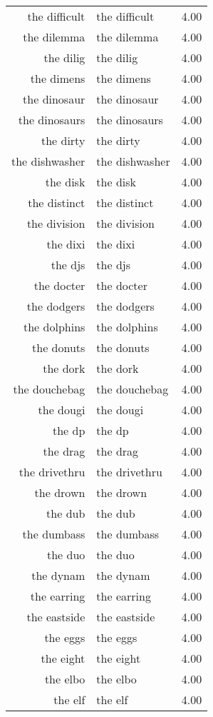 \begin{table}[ht]
\begin{tabular}{rlr}
  the difficult & the difficult & 4.00 \\ 
  the dilemma & the dilemma & 4.00 \\ 
  the dilig & the dilig & 4.00 \\ 
  the dimens & the dimens & 4.00 \\ 
  the dinosaur & the dinosaur & 4.00 \\ 
  the dinosaurs & the dinosaurs & 4.00 \\ 
  the dirty & the dirty & 4.00 \\ 
  the dishwasher & the dishwasher & 4.00 \\ 
  the disk & the disk & 4.00 \\ 
  the distinct & the distinct & 4.00 \\ 
  the division & the division & 4.00 \\ 
  the dixi & the dixi & 4.00 \\ 
  the djs & the djs & 4.00 \\ 
  the docter & the docter & 4.00 \\ 
  the dodgers & the dodgers & 4.00 \\ 
  the dolphins & the dolphins & 4.00 \\ 
  the donuts & the donuts & 4.00 \\ 
  the dork & the dork & 4.00 \\ 
  the douchebag & the douchebag & 4.00 \\ 
  the dougi & the dougi & 4.00 \\ 
  the dp & the dp & 4.00 \\ 
  the drag & the drag & 4.00 \\ 
  the drivethru & the drivethru & 4.00 \\ 
  the drown & the drown & 4.00 \\ 
  the dub & the dub & 4.00 \\ 
  the dumbass & the dumbass & 4.00 \\ 
  the duo & the duo & 4.00 \\ 
  the dynam & the dynam & 4.00 \\ 
  the earring & the earring & 4.00 \\ 
  the eastside & the eastside & 4.00 \\ 
  the eggs & the eggs & 4.00 \\ 
  the eight & the eight & 4.00 \\ 
  the elbo & the elbo & 4.00 \\ 
  the elf & the elf & 4.00 \\ 

\end{tabular}
\end{table}
